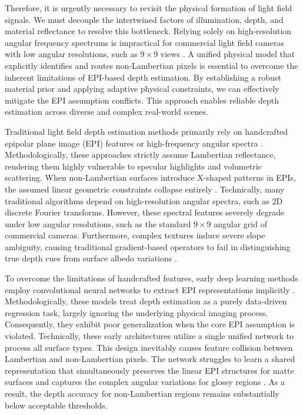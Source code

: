 \documentclass[lettersize,journal]{IEEEtran}
\begin{document}
Therefore, it is urgently necessary to revisit the physical formation of light field signals. We must decouple the intertwined factors of illumination, depth, and material reflectance to resolve this bottleneck. Relying solely on high-resolution angular frequency spectrums is impractical for commercial light field cameras with low angular resolutions, such as $9 \times 9$ views \cite{7}. A unified physical model that explicitly identifies and routes non-Lambertian pixels is essential to overcome the inherent limitations of EPI-based depth estimation. By establishing a robust material prior and applying adaptive physical constraints, we can effectively mitigate the EPI assumption conflicts. This approach enables reliable depth estimation across diverse and complex real-world scenes.

Traditional light field depth estimation methods primarily rely on handcrafted epipolar plane image (EPI) features or high-frequency angular spectra \cite{8}. Methodologically, these approaches strictly assume Lambertian reflectance, rendering them highly vulnerable to specular highlights and volumetric scattering. When non-Lambertian surfaces introduce X-shaped patterns in EPIs, the assumed linear geometric constraints collapse entirely . Technically, many traditional algorithms depend on high-resolution angular spectra, such as 2D discrete Fourier transforms. However, these spectral features severely degrade under low angular resolutions, such as the standard $9 \times 9$ angular grid of commercial cameras. Furthermore, complex textures induce severe slope ambiguity, causing traditional gradient-based operators to fail in distinguishing true depth cues from surface albedo variations \cite{9}.

To overcome the limitations of handcrafted features, early deep learning methods employ convolutional neural networks to extract EPI representations implicitly \cite{10}. Methodologically, these models treat depth estimation as a purely data-driven regression task, largely ignoring the underlying physical imaging process. Consequently, they exhibit poor generalization when the core EPI assumption is violated. Technically, these early architectures utilize a single unified network to process all surface types. This design inevitably causes feature collision between Lambertian and non-Lambertian pixels. The network struggles to learn a shared representation that simultaneously preserves the linear EPI structures for matte surfaces and captures the complex angular variations for glossy regions \cite{11}. As a result, the depth accuracy for non-Lambertian regions remains substantially below acceptable thresholds.
\end{document}
